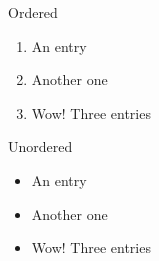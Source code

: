 \documentclass{article}
\begin{document}
	Ordered
	\begin{enumerate}
		\item An entry
		\item Another one
		\item Wow! Three entries
	\end{enumerate}
	
	Unordered
	\begin{itemize}
		\item An entry
		\item Another one
		\item Wow! Three entries
	\end{itemize}
\end{document}
